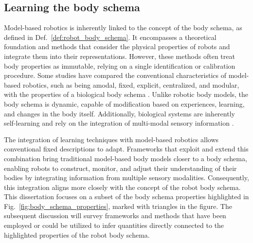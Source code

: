 \subsection{Learning the body schema}
Model-based robotics is inherently linked to the concept of the body schema, as defined in Def.~\ref{def:robot_body_schema}. It encompasses a theoretical foundation and methods that consider the physical properties of robots and integrate them into their representations. However, these methods often treat body properties as immutable, relying on a single identification or calibration procedure. Some studies have compared the conventional characteristics of model-based robotics, such as being amodal, fixed, explicit, centralized, and modular, with the properties of a biological body schema \cite{Hoffmann2021Bodymodelshumans}. Unlike robotic body models, the body schema is dynamic, capable of modification based on experiences, learning, and changes in the body itself. Additionally, biological systems are inherently self-learning and rely on the integration of multi-modal sensory information \cite{Asada2018168Proprioceptionbodyschema}.

The integration of learning techniques with model-based robotics allows conventional fixed descriptions to adapt. Frameworks that exploit and extend this combination bring traditional model-based body models closer to a body schema, enabling robots to construct, monitor, and adjust their understanding of their bodies by integrating information from multiple sensory modalities. Consequently, this integration aligns more closely with the concept of the robot body schema. This dissertation focuses on a subset of the body schema properties highlighted in Fig.~\ref{fig:body_schema_properties}, marked with triangles in the figure. The subsequent discussion will survey frameworks and methods that have been employed or could be utilized to infer quantities directly connected to the highlighted properties of the robot body schema.


